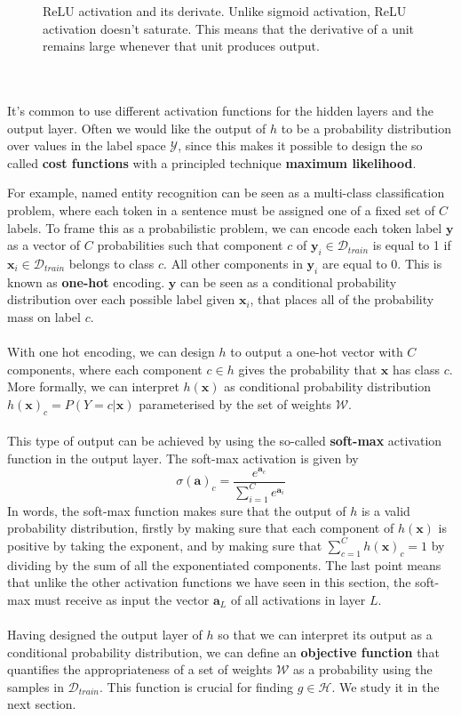 \begin{figure}
	\centering
	
	\caption{ReLU activation and its derivate. Unlike sigmoid activation, ReLU activation doesn't saturate. This means that the derivative of a unit remains large whenever that unit produces output.}
	\label{relu}
\end{figure}
\\\\
It's common to use different activation functions for the hidden layers and the output layer. Often we would like the output of $h$ to be a probability distribution over values in the label space $\mathcal{Y}$, since this makes it possible to design the so called \textbf{cost functions} with a principled technique \textbf{maximum likelihood}.

For example, named entity recognition can be seen as a multi-class classification problem, where each token in a sentence must be assigned one of a fixed set of $C$ labels. To frame this as a probabilistic problem, we can encode each token label $\mathbf{y}$ as a vector of $C$ probabilities such that component $c$ of $\mathbf{y}_i \in \mathcal{D}_{train}$ is equal to 1 if $\mathbf{x}_i \in \mathcal{D}_{train}$ belongs to class $c$. All other components in $\mathbf{y}_i$ are equal to 0. This is known as \textbf{one-hot} encoding. $\mathbf{y}$ can be seen as a conditional probability distribution over each possible label given $\mathbf{x}_i$, that places all of the probability mass on label $c$.
\\\\
With one hot encoding, we can design $h$ to output a one-hot vector with $C$ components, where each component $c \in h$ gives the probability that $\mathbf{x}$ has class $c$. More formally, we can interpret $h(\mathbf{x})$ as conditional probability distribution $h(\mathbf{x})_c = P(Y = c | \mathbf{x})$ parameterised by the set of weights $\mathcal{W}$.
\\\\
This type of output can be achieved by using the so-called \textbf{soft-max} activation function in the output layer. The soft-max activation is given by 
$$
\sigma(\mathbf{a})_c = \frac{e^{\mathbf{a}_c}}{\sum_{i = 1}^C e^{\mathbf{a}_i}}
$$ 
In words, the soft-max function makes sure that the output of $h$ is a valid probability distribution, firstly by making sure that each component of $h(\mathbf{x})$ is positive by taking the exponent, and by making sure that $\sum_{c=1}^Ch(\mathbf{x})_c = 1$ by dividing by the sum of all the exponentiated components. The last point means that unlike the other activation functions we have seen in this section, the soft-max must receive as input the vector $\mathbf{a}_L$ of all activations in layer $L$.
\\\\
Having designed the output layer of $h$ so that we can interpret its output as a conditional probability distribution, we can define an \textbf{objective function} that quantifies the appropriateness of a set of weights $\mathcal{W}$ as a probability using the samples in $\mathcal{D}_{train}$. This function is crucial for finding $g \in \mathcal{H}$. We study it in the next section.

